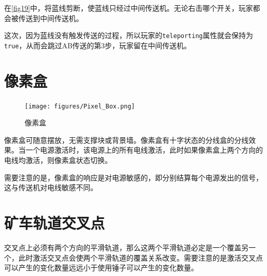 \begin{example}
在\autoref{fig19}中，将蓝线剪断，使蓝线只经过中间传送机。无论右击哪个开关，玩家都会被传送到中间传送机。

这次，因为蓝线没有触发传送的过程，所以玩家的\lstinline{teleporting}属性就会保持为\lstinline{true}，从而会跳过AB传送的第3步，玩家留在中间传送机。
\end{example}

\section{像素盒}\label{sec21}
\begin{figure}[!ht]
\centering
\texttt{[image: figures/Pixel\_Box.png]}
\caption{像素盒}
\end{figure}
像素盒可随意摆放，无需支撑块或背景墙。像素盒有十字状态的分线盒的分线效果。当一个电源激活时，该电源上的所有电线激活，此时如果像素盒上两个方向的电线均激活，则像素盒状态切换。

需要注意的是，像素盒的响应是对电源敏感的，即分别结算每个电源发出的信号，这与传送机对电线敏感不同。

\section{矿车轨道交叉点}
交叉点上必须有两个方向的平滑轨道，那么这两个平滑轨道必定是一个覆盖另一个，此时激活交叉点会使两个平滑轨道的覆盖关系改变。需要注意的是激活交叉点可以产生的变化数量远远小于使用锤子可以产生的变化数量。

